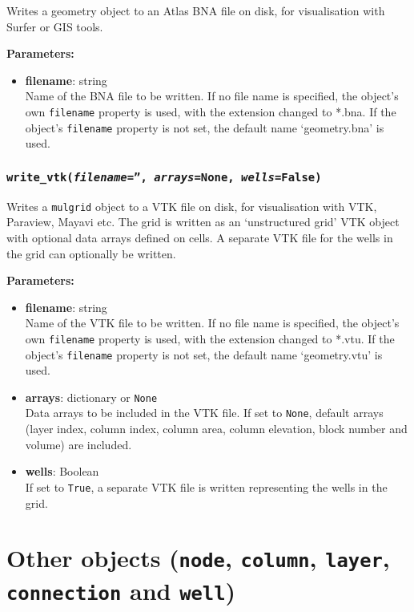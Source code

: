 Writes a geometry object to an Atlas BNA file on disk, for visualisation with Surfer or GIS tools.

\textbf{Parameters:}
\begin{itemize}
\item \textbf{filename}: string\\
  Name of the BNA file to be written.  If no file name is specified, the object's own \texttt{filename} property is used, with the extension changed to *.bna.  If the object's \texttt{filename} property is not set, the default name `geometry.bna' is used.
\end{itemize}

\begin{snugshade}\subsubsection{\texttt{write\_vtk(\emph{filename}='', \emph{arrays}=None, \emph{wells}=False)}}\end{snugshade}
\label{sec:mulgrid:write_vtk}

Writes a \texttt{mulgrid} object to a VTK file on disk, for visualisation with VTK, Paraview, Mayavi etc.  The grid is written as an `unstructured grid' VTK object with optional data arrays defined on cells.  A separate VTK file for the wells in the grid can optionally be written.

\textbf{Parameters:}
\begin{itemize}
\item \textbf{filename}: string\\
  Name of the VTK file to be written.  If no file name is specified, the object's own \texttt{filename} property is used, with the extension changed to *.vtu.  If the object's \texttt{filename} property is not set, the default name `geometry.vtu' is used.
\item \textbf{arrays}: dictionary or \texttt{None}\\
  Data arrays to be included in the VTK file.  If set to \texttt{None}, default arrays (layer index, column index, column area, column elevation, block number and volume) are included.
\item \textbf{wells}: Boolean\\
  If set to \texttt{True}, a separate VTK file is written representing the wells in the grid.
\end{itemize}

\section{Other objects (\texttt{node}, \texttt{column}, \texttt{layer}, \texttt{connection} and \texttt{well})}
\label{other_mulgrid_objects}


